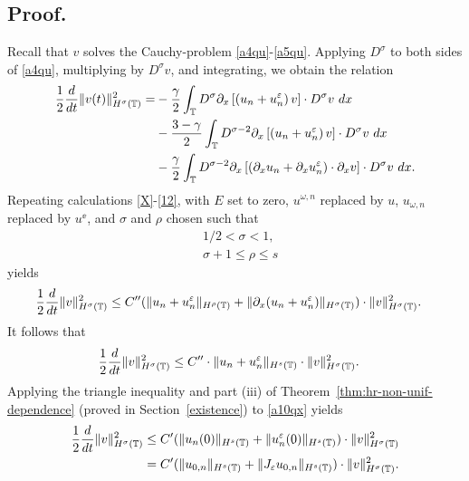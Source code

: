 \subsection{Proof.}
Recall that $v$ solves the Cauchy-problem \eqref{a4qu}-\eqref{a5qu}.
Applying $D^\sigma$ to both sides of \eqref{a4qu}, multiplying by
$D^\sigma v$, and integrating, we obtain the
relation
\begin{equation*}
\begin{split}
\frac{1}{2}\frac{d}{dt}\|v(t)\|_{H^\sigma(\mathbb{T})}^2
= & - \frac{\gamma}{2}\int_{\mathbb{T}} D^\sigma
\partial_x \left[ \left( u_n + u^\varepsilon_n \right)v
\right]\cdot D^\sigma v \ dx
\\
& - \frac{3-\gamma}{2}\int_{\mathbb{T}} D^{\sigma
-2} \partial_x \left[ \left( u_n + u^\varepsilon_n
\right)v \right] \cdot D^\sigma v \ dx
\\
& - \frac{\gamma}{2}\int_{\mathbb{T}} D^{\sigma
-2}
\partial_x \left[ \left( \partial_x u_n + \partial_x u^\varepsilon_n
\right)\cdot \partial_x v \right] \cdot
D^\sigma v \ dx.
\end{split}
\end{equation*}
Repeating calculations \eqref{X}-\eqref{12}, with $E$ set to zero,
$u^{\omega,n}$ replaced by $u$, $u_{\omega,n}$ replaced by $u^\ee$, and
$\sigma$ and $\rho$ chosen such that
%
\begin{equation}
\begin{split}
& 1/2 < \sigma < 1,
\\
& \sigma + 1 \le \rho \le s 
\end{split}
\end{equation}
yields
\begin{equation*}
\begin{split}
\frac{1}{2}\frac{d}{dt} \|v\|_{H^\sigma(\mathbb{T})}^2
& \le
C'' (\|u_n + u^\varepsilon_n \|_{H^{\rho}(\mathbb{T})} +
\|\partial_x(u_n + u^\varepsilon_n) \|_{H^\sigma(\mathbb{T})})
\cdot \|v\|_{H^\sigma(\mathbb{T})}^2.
\end{split}
\end{equation*}
\medskip
It follows that 
\begin{equation}
\begin{split}
\frac{1}{2}\frac{d}{dt} \|v\|_{H^{\sigma}(\mathbb{T})}^2
& \le
C'' \cdot \|u_n
+ u^\varepsilon_n\|_{H^{s}(\mathbb{T})}\cdot \|v\|_{H^{\sigma}(\mathbb{T})}^2.
\label{a10qx}
\end{split}
\end{equation}
Applying the triangle inequality and
part (iii) of Theorem~\ref{thm:hr-non-unif-dependence} (proved in
Section~\ref{existence})
to \eqref{a10qx} yields
%
\begin{equation}
\begin{split}
\label{a11qx}
\frac{1}{2}\frac{d}{dt} \|v\|_{H^{\sigma}(\mathbb{T})}^2
& \le
C' (\|u_n(0)\|_{H^{s}(\mathbb{T})}
+ \|u^\varepsilon_n(0)\|_{H^{s}(\mathbb{T})})\cdot \|v\|_{H^{\sigma}(\mathbb{T})}^2
\\
& = C' (\|u_{0,n}\|_{H^{s}(\mathbb{T})}
+ \|J_\varepsilon u_{0,n}\|_{H^{s}(\mathbb{T})})\cdot \|v\|_{H^{\sigma}(\mathbb{T})}^2.
\end{split}
\end{equation}
